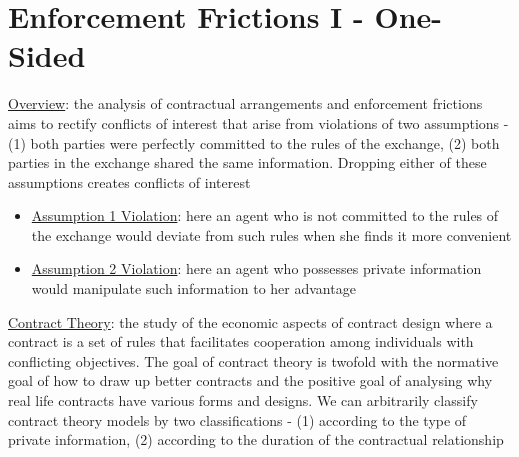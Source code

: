 \documentclass{article}
\begin{document}
\newpage

\section{Enforcement Frictions I - One-Sided}

\vspace{2.5mm}
\par \underline{Overview}: the analysis of contractual arrangements and enforcement frictions aims to rectify conflicts of interest that arise from violations of two assumptions - (1) both parties were perfectly committed to the rules of the exchange, (2) both parties in the exchange shared the same information. Dropping either of these assumptions creates conflicts of interest
\begin{itemize}
    \item  \underline{Assumption 1 Violation}: here an agent who is not committed to the rules of the exchange would deviate from such rules when she finds it more convenient
    \item  \underline{Assumption 2 Violation}: here an agent who possesses private information would manipulate such information to her advantage
\end{itemize}
\vspace{2.5mm}
\par \underline{Contract Theory}: the study of the economic aspects of contract design where a contract is a set of rules that facilitates cooperation among individuals with conflicting objectives. The goal of contract theory is twofold with the normative goal of how to draw up better contracts and the positive goal of analysing why real life contracts have various forms and designs. We can arbitrarily classify contract theory models by two classifications - (1) according to the type of private information, (2) according to the duration of the contractual relationship
\end{document}
